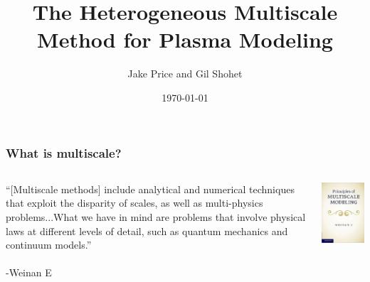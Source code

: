 \documentclass{beamer}
\title{The Heterogeneous Multiscale Method for Plasma Modeling}
\author[Price and Shohet]{Jake Price and Gil Shohet}
\institute[CPSSW]{Computational Physics Student Summer Workshop}
\date{\today}
\begin{document}
\begin{frame}
\titlepage
\end{frame}

\begin{frame}
\frametitle{What is multiscale?}
\begin{columns}[T] 
\begin{column}{.48\textwidth}
\vspace{0.9cm}
``[Multiscale methods] include analytical and numerical techniques that exploit the disparity of scales, as well as multi-physics problems...What we have in mind are problems that involve physical laws at different levels of detail, such as quantum mechanics and continuum models.''\\
\hfill
\\\hfill-Weinan E
\end{column}%

\hfill%

\begin{column}{.48\textwidth}
\includegraphics[width=\textwidth]{principles.jpg}
\end{column}%
\end{columns}
\end{frame}
\end{document}
